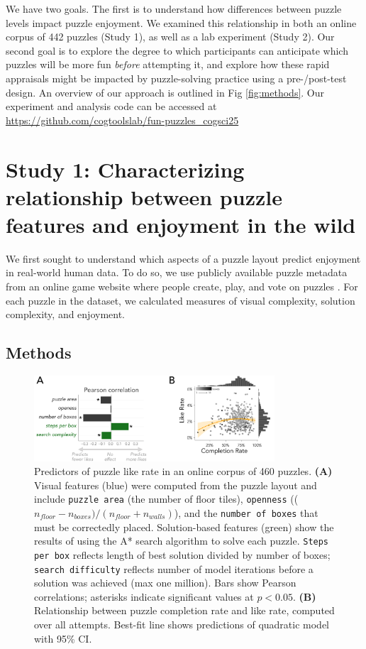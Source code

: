\documentclass[10pt,letterpaper]{article}
\begin{document}
We have two goals. The first is to understand how differences between puzzle levels impact puzzle enjoyment. We examined this relationship in both an online corpus of 442 puzzles (Study 1), as well as a lab experiment (Study 2). Our second goal is to explore the degree to which participants can anticipate which puzzles will be more fun \textit{before} attempting it, and explore how these rapid appraisals might be impacted by puzzle-solving practice using a pre-/post-test design. An overview of our approach is outlined in Fig \ref{fig:methods}. Our experiment and analysis code can be accessed at 
\url{https://github.com/cogtoolslab/fun-puzzles_cogsci25}

\section{Study 1: Characterizing relationship between puzzle features and enjoyment in the wild}
We first sought to understand which aspects of a puzzle layout predict enjoyment in real-world human data. To do so, we use publicly available puzzle metadata from an online game website where people create, play, and vote on puzzles \cite{sokobanonline}. For each puzzle in the dataset, we calculated measures of visual complexity, solution complexity, and enjoyment. 

\subsection{Methods}

\begin{figure}[ht]
    \centering
    \includegraphics[width=0.8\textwidth]{figures/fig3.pdf}
    \caption{Predictors of puzzle like rate in an online corpus of 460 puzzles. \textbf{(A)} Visual features (blue) were computed from the puzzle layout and include \texttt{puzzle area} (the number of floor tiles), \texttt{openness} (($n_{floor} - n_{boxes}) / (n_{floor} + n_{walls})$), and the \texttt{number of boxes} that must be correctedly placed. 
    Solution-based features (green) show the results of using the A* search algorithm to solve each puzzle. \texttt{Steps per box} reflects length of best solution divided by number of boxes; \texttt{search difficulty} reflects number of model iterations before a solution was achieved (max one million). Bars show Pearson correlations; asterisks indicate significant values at $p < 0.05$. \textbf{(B)} Relationship between puzzle completion rate and like rate, computed over all attempts. Best-fit line shows predictions of quadratic model with 95\% CI.}
    \label{fig:gleaning-figure}
\end{figure}
\end{document}
